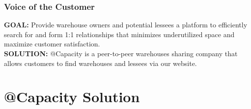 \documentclass{beamer}
\begin{document}
\begin{frame}
\frametitle{Voice of the Customer}


\begin{table}[]
\centering
{}
\end{table}


\textbf{GOAL:} Provide warehouse owners and potential lessees a platform to efficiently search for and form 1:1 relationships that minimizes underutilized space and maximize customer satisfaction. \\


\textbf{SOLUTION: }@Capacity is a peer-to-peer warehouses sharing company that allows customers to find warehouses and lessees via our website. \\
\end{frame}






\section{@Capacity Solution}
\end{document}
